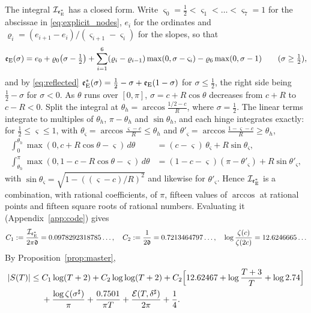 \documentclass[11pt,a4paper]{article}
\makeatletter
\numberwithin{equation}{section}
\DeclareRobustCommand{\CGref}[1]{\ref{#1}}
\DeclareRobustCommand{\CGeqref}[1]{\eqref{#1}}
\let\CG@origref\ref
\let\CG@origeqref\eqref
\newcommand{\CG@gettip}[1]{\@ifundefined{CGTip@#1}{#1}{\csname CGTip@#1\endcsname}}
\DeclareRobustCommand{\CGref}[1]{\pdftooltip{\CG@origref{#1}}{\CG@gettip{#1}}}
\DeclareRobustCommand{\CGeqref}[1]{\pdftooltip{\CG@origeqref{#1}}{\CG@gettip{#1}}}
\theoremstyle{definition}
\theoremstyle{remark}
\newcommand{\eE}{\mathfrak e_{\rm E}}
\makeatother
\begin{document}
The integral $\mathcal I_{\eE^*}$ has a closed form. Write $\varsigma_0=\frac12<\varsigma_1<\dots<\varsigma_7=1$ for the abscissae in \CGeqref{eq:explicit_nodes}, $e_i$ for the ordinates and $\varrho_i=(e_{i+1}-e_i)/(\varsigma_{i+1}-\varsigma_i)$ for the slopes, so that
\begin{equation}
\eE(\sigma)=e_0+\varrho_0\bigl(\sigma-\tfrac12\bigr)+\sum_{i=1}^{6}(\varrho_i-\varrho_{i-1})\max(0,\sigma-\varsigma_i)-\varrho_6\max(0,\sigma-1)\qquad(\sigma\ge\tfrac12),
\label{eq:disp_18}
\end{equation}
and by \CGeqref{eq:reflected} $\eE^*(\sigma)=\frac12-\sigma+\eE(1-\sigma)$ for $\sigma\le\frac12$, the right side being $\frac12-\sigma$ for $\sigma<0$. As $\theta$ runs over $[0,\pi]$, $\sigma=c+R\cos\theta$ decreases from $c+R$ to $c-R<0$. Split the integral at $\theta_h=\arccos\frac{1/2-c}R$, where $\sigma=\frac12$. The linear terms integrate to multiples of $\theta_h$, $\pi-\theta_h$ and $\sin\theta_h$, and each hinge integrates exactly: for $\frac12\le\varsigma\le1$, with $\theta_\varsigma=\arccos\frac{\varsigma-c}R\le\theta_h$ and $\theta'_\varsigma=\arccos\frac{1-\varsigma-c}R\ge\theta_h$,
\begin{equation}
\begin{aligned}
\int_0^{\theta_h}\max(0,c+R\cos\theta-\varsigma)\,d\theta&=(c-\varsigma)\,\theta_\varsigma+R\sin\theta_\varsigma,\\
\int_{\theta_h}^{\pi}\max(0,1-c-R\cos\theta-\varsigma)\,d\theta&=(1-c-\varsigma)(\pi-\theta'_\varsigma)+R\sin\theta'_\varsigma,
\end{aligned}
\label{eq:hinge_integrals}
\end{equation}
with $\sin\theta_\varsigma=\sqrt{1-((\varsigma-c)/R)^2}$ and likewise for $\theta'_\varsigma$. Hence $\mathcal I_{\eE^*}$ is a combination, with rational coefficients, of $\pi$, fifteen values of $\arccos$ at rational points and fifteen square roots of rational numbers. Evaluating it (Appendix~\CGref{app:code}) gives
\begin{equation}
C_1:=\frac{\mathcal I_{\eE^*}}{2\pi\mathfrak d}=0.0978292318785\ldots,\quad C_2:=\frac1{2\mathfrak d}=0.7213464797\ldots,\quad \log\frac{\zeta(c)}{\zeta(2c)}=12.6246665\ldots
\label{eq:C1_value}
\end{equation}
By Proposition~\CGref{prop:master},
\begin{equation}
\begin{split}
|S(T)|\le{}&C_1\log(T+2)+C_2\log\log(T+2)+C_2\Bigl[12.62467+\log\frac{T+3}T+\log2.74\Bigr]\\
&+\frac{\log\zeta(\sigma^\sharp)}\pi+\frac{0.7501}{\pi T}+\frac{\mathcal E(T,\delta^\sharp)}{2\pi}+\frac14 .
\end{split}
\label{eq:explicit_assembled}
\end{equation}
\end{document}
